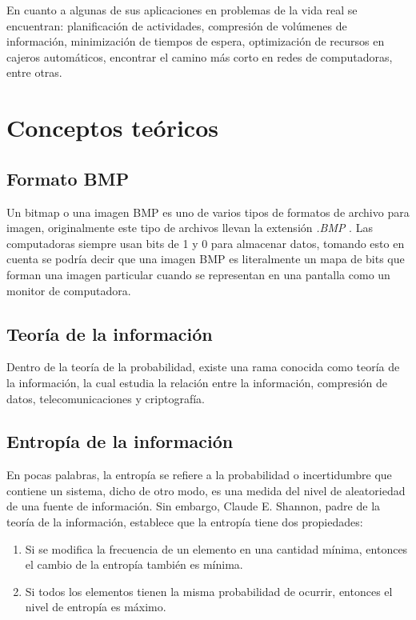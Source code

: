 \documentclass[12pt,twoside]{article}
\begin{document}
    En cuanto a algunas de sus aplicaciones en problemas de la vida real se encuentran: planificación de actividades, compresión de volúmenes de información, minimización de tiempos de espera, optimización de recursos en cajeros automáticos, encontrar el camino más corto en redes de computadoras, entre otras.
    
    \newpage
    \section{Conceptos te\'oricos}
    \subsection{Formato BMP}
    Un bitmap o una imagen BMP es uno de varios tipos de formatos de archivo para imagen, originalmente este tipo de archivos llevan la extensión {\it .BMP} . Las computadoras siempre usan bits de 1 y 0 para almacenar datos, tomando esto en cuenta se podría decir que una imagen BMP es literalmente un mapa de bits que forman una imagen particular cuando se representan en una pantalla como un monitor de computadora.
    
    \subsection{Teoría de la información}
    Dentro de la teoría de la probabilidad, existe una rama conocida como teoría de la información, la cual estudia la relación entre la información, compresión de datos, telecomunicaciones y criptografía.
    
    \subsection{Entropía de la información}
    
    En pocas palabras, la entropía se refiere a la probabilidad o incertidumbre que contiene un sistema, dicho de otro modo, es una medida del nivel de aleatoriedad de una fuente de información. Sin embargo, Claude E. Shannon, padre de la teoría de la información, establece que la entropía tiene dos propiedades:
    
    \begin{enumerate}
    \item Si se modifica la frecuencia de un elemento en una cantidad mínima, entonces el cambio de la entropía también es mínima.
    \item Si todos los elementos tienen la misma probabilidad de ocurrir, entonces el nivel de entropía es máximo.
    \end{enumerate}
    
\end{document}
